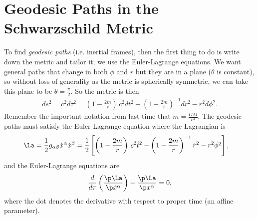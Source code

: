 \documentclass[a4paper, 11pt, normalem]{report}
\begin{document}
\chapter{Geodesic Paths in the Schwarzschild Metric}
To find \emph{geodesic paths} (i.e. inertial frames), then the first thing to do is write down the metric and tailor it; we use the Euler-Lagrange equations. 
We want general paths that change in both $\phi$ and $r$ but they are in a plane ($\theta$ is constant), so without loss of generality as the metric is spherically symmetric, we can take this plane to be $\theta=\frac{\pi}{2}$.
So the metric is then
\begin{align}
    ds^2 = c^2d\tau^2 = \left(1-\frac{2m}{r}\right)\,c^2dt^2 - \left(1-\frac{2m}{r}\right)^{-1}dr^2 - r^2d\phi^2.
\end{align}
Remember the important notation from last time that $m=\frac{GM}{c^2}$.
The geodesic paths must satisfy the Euler-Lagrange equation where the Lagrangian is
\begin{align}
    \La &= \frac12g_{\alpha\beta}\dot{x}^\alpha\dot{x}^\beta = \frac12\left[\left(1-\frac{2m}{r}\right)\,c^2\dot{t}^2 - \left(1-\frac{2m}{r}\right)^{-1}\dot{r}^2 - r^2\dot{\phi^2}\right],
\end{align}
and the Euler-Lagrange equations are
\begin{align}
    \frac{d}{d\tau}\left(\frac{\p\La}{\p\dot{x}^\alpha}\right) - \frac{\p\La}{\p x^\alpha} = 0,
\end{align}
where the dot denotes the derivative with tespect to proper time (an affine parameter).
\end{document}
